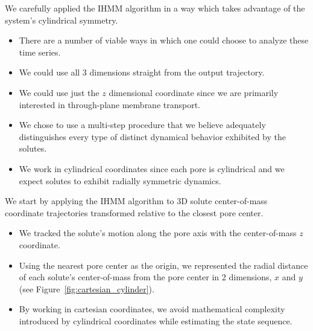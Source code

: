 \documentclass{article}
\begin{document}
  We carefully applied the IHMM algorithm in a way which takes advantage of the
  system's cylindrical symmetry.
  \begin{itemize}
    \item There are a number of viable ways in which one could choose to analyze 
    these time series.
    \item We could use all 3 dimensions straight from the output trajectory.
    \item We could use just the $z$ dimensional coordinate since we are primarily
    interested in through-plane membrane transport.
    \item We chose to use a multi-step procedure that we believe adequately
    distinguishes every type of distinct dynamical behavior exhibited by 
    the solutes.
    \item We work in cylindrical coordinates since each pore is cylindrical
    and we expect solutes to exhibit radially symmetric dynamics.
  \end{itemize}  
  
  We start by applying the IHMM algorithm to 3D solute center-of-mass coordinate 
  trajectories transformed relative to the closest pore center.
  \begin{itemize}
    \item We tracked the solute's motion along the pore axis with the center-of-mass
    $z$ coordinate.
    \item Using the nearest pore center as the origin, we represented the radial 
    distance of each solute's center-of-mass from the pore center in 2 dimensions,
    $x$ and $y$ (see Figure~\ref{fig:cartesian_cylinder}).
    \item By working in cartesian coordinates, we avoid mathematical complexity
    introduced by cylindrical coordinates while estimating the state sequence.
  \end{itemize}
  
\end{document}
